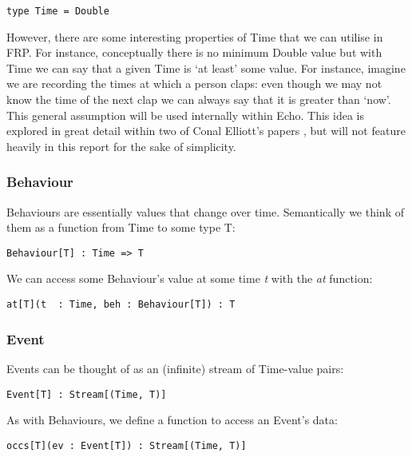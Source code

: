 \begin{verbatim}
type Time = Double
\end{verbatim}    

        However, there are some interesting properties of Time that we can utilise in FRP. For instance,
        conceptually there is no minimum Double value but with Time we can say that a given Time is `at least'
        some value. For instance, imagine we are recording the times at which a person claps: even though we
        may not know the time of the next clap we can always say that it is greater than `now'. This
        general assumption will be used internally within Echo. This idea is explored in great detail
        within two of Conal Elliott's papers \cite{Elliott1997}, \cite{Elliott2009} but will not feature
        heavily in this report for the sake of simplicity.
   
      \subsubsection{Behaviour}
        Behaviours are essentially values that change over time. Semantically we think of them as
        a function from Time to some type T:

\begin{verbatim}
Behaviour[T] : Time => T
\end{verbatim}
        
        We can access some Behaviour's value at some time \emph{t} with the \emph{at} function:

\begin{verbatim}
at[T](t  : Time, beh : Behaviour[T]) : T
\end{verbatim}
      
      \subsubsection{Event}
        Events can be thought of as an (infinite) stream of Time-value pairs:

\begin{verbatim}
Event[T] : Stream[(Time, T)]
\end{verbatim}
        
        As with Behaviours, we define a function to access an Event's data:
        
\begin{verbatim}
occs[T](ev : Event[T]) : Stream[(Time, T)]
\end{verbatim}
       
